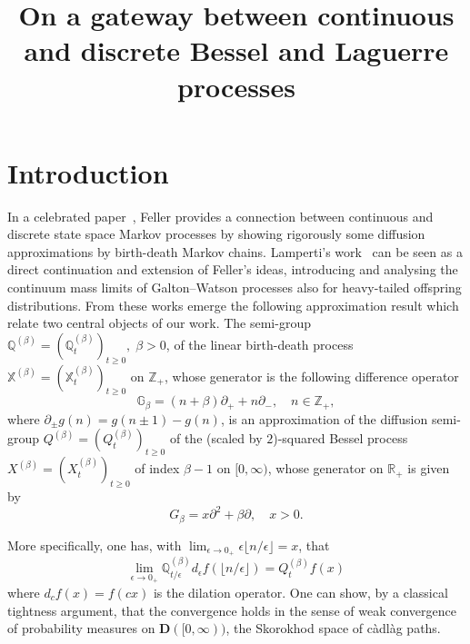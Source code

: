 \documentclass[AHL,Unicode,longabstracts]{cedram}
\author[\initial{L.} \lastname{Miclo}]{\firstname{Laurent} \lastname{Miclo}}
\author[\initial{P.} \lastname{Patie}]{\firstname{Pierre} \lastname{Patie}}
\title[A gateway between continuous and discrete processes]{On a gateway between continuous and discrete Bessel and Laguerre processes}
\newcommand{\RR}{\mathbb{R}}
\newcommand{\ZZ}{\mathbb{Z}}
\newcommand{\pa}{\partial}
\newcommand{\Bg}{G}
\newcommand{\discret}[1]{\mathds{#1}}
\newcommand{\cont}[1]{{#1}}
\begin{document}
\maketitle
\section{Introduction}

In a celebrated paper~\cite{Feller-Gen}, Feller provides a connection between continuous and discrete state space Markov processes by showing rigorously some diffusion approximations by birth-death Markov chains. Lamperti's work~\cite{Lamperti-67b} can be seen as a direct continuation and extension of Feller's ideas, introducing and analysing the continuum mass limits of Galton--Watson processes also for heavy-tailed offspring distributions. From these works emerge the following approximation result which relate two central objects of our work. The semi-group $\discret{Q}^{(\beta)}=(\discret{Q}^{(\beta)}_t)_{t\geq 0},\; \beta>0$, of the linear birth-death process $\discret{X}^{(\beta)}=(\discret{X}^{(\beta)}_t)_{t\geq 0}$ on $\ZZ_+$, whose generator is the following difference operator
\begin{equation*}
\discret{G}_{\beta}=(n+\beta) \pa_+ + n\pa_-,\quad n\in \ZZ_+,
\end{equation*}
where $\pa_{\pm}g(n)=g(n\pm 1)-g(n)$, is an approximation of the diffusion semi-group $\cont{Q}^{(\beta)}=(\cont{Q}^{(\beta)}_t)_{t\geq 0}$ of the (scaled by $2$)-squared Bessel process $\cont{X}^{(\beta)}=(\cont{X}^{(\beta)}_t)_{t\geq 0}$ of index $\beta-1$ on $[0,\infty)$, whose generator on $\RR_+$ is given by
\[
\Bg_{\beta}=x\pa^2+\beta\pa, \quad x>0.
\]

More specifically, one has, with $\lim_{\epsilon \to 0_+} \epsilon{\lfloor n/\epsilon \rfloor}=x$, that
\[
\lim_{\epsilon\to 0_+}\discret{Q}_{t/\epsilon}^{(\beta)} \cont{d}_{\epsilon} f (\lfloor n/\epsilon \rfloor)= \cont{Q}^{(\beta)}_t f(x)
\]
where $\cont{d}_c f(x)=f(cx)$ is the dilation operator. One can show, by a classical tightness argument, that the convergence holds in the sense of weak convergence of probability measures on $\mathbf{D}([0,\infty))$, the Skorokhod space of c\`adl\`ag paths.
\end{document}
